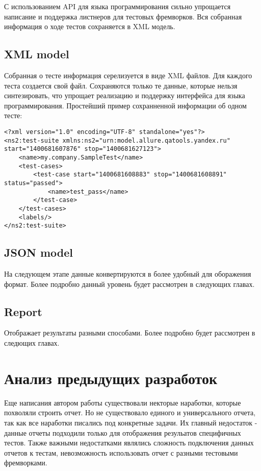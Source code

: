 С использованием API для языка программирования сильно упрощается написание и поддержка листнеров для тестовых фремворков. Вся собранная информация о ходе тестов сохраняется в XML модель. 

\subsection{XML model}

Собранная о тесте информация серелизуется в виде XML файлов. Для каждого теста создается свой файл. Сохраняются только те данные, которые нельзя синтезировать, что упрощает реализацию и поддержку интерфейса для языка программирования. Простейший пример сохранненной информации об одном тесте:

\begin{lstlisting}[style=XML]
<?xml version="1.0" encoding="UTF-8" standalone="yes"?>
<ns2:test-suite xmlns:ns2="urn:model.allure.qatools.yandex.ru" start="1400681607876" stop="1400681627123">
    <name>my.company.SampleTest</name>
    <test-cases>
        <test-case start="1400681608883" stop="1400681608891" status="passed">
            <name>test_pass</name>
        </test-case>
    </test-cases>
    <labels/>
</ns2:test-suite>
\end{lstlisting}

\subsection{JSON model}

На следующем этапе данные конвертируются в более удобный для оборажения формат. Более подробно данный уровень будет рассмотрен в следующих главах.

\subsection{Report}

Отображает результаты разными способами. Более подробно будет рассмотрен в следющих главах.

\section{Анализ предыдущих разработок}

Еще написания автором работы существовали некторые наработки, которые похволяли строить отчет. Но не существовало единого и универсального отчета, так как все наработки писались под конкретные задачи. Их главный недостаток - данные отчеты подходили только для отображения резульатов специфичных тестов. Также важными недостатками являлись сложность подключения данных отчетов к тестам, невозможность использовать отчет с разными тестовыми фремворками. 

